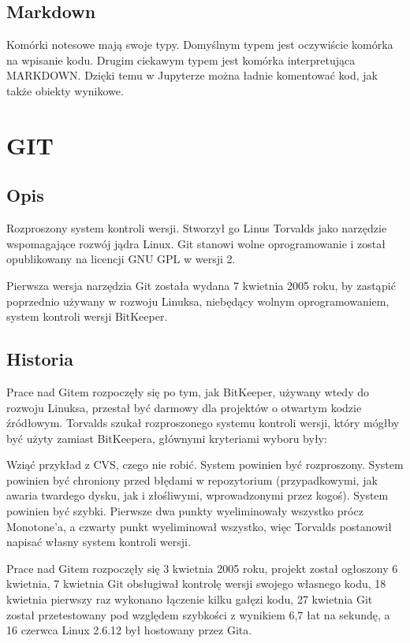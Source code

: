 \documentclass{article}
\begin{document}
\subsection{Markdown}
Komórki notesowe mają swoje typy. Domyślnym typem jest oczywiście komórka na wpisanie kodu. Drugim ciekawym typem jest komórka interpretująca MARKDOWN. Dzięki temu w Jupyterze można ładnie komentować kod, jak także obiekty wynikowe.
\newpage
\section{GIT}
\subsection{Opis}
Rozproszony system kontroli wersji. Stworzył go Linus Torvalds jako narzędzie wspomagające rozwój jądra Linux. Git stanowi wolne oprogramowanie i został opublikowany na licencji GNU GPL w wersji 2.

Pierwsza wersja narzędzia Git została wydana 7 kwietnia 2005 roku, by zastąpić poprzednio używany w rozwoju Linuksa, niebędący wolnym oprogramowaniem, system kontroli wersji BitKeeper.
\subsection{Historia}
Prace nad Gitem rozpoczęły się po tym, jak BitKeeper, używany wtedy do rozwoju Linuksa, przestał być darmowy dla projektów o otwartym kodzie źródłowym. Torvalds szukał rozproszonego systemu kontroli wersji, który mógłby być użyty zamiast BitKeepera, głównymi kryteriami wyboru były:

Wziąć przykład z CVS, czego nie robić.
System powinien być rozproszony.
System powinien być chroniony przed błędami w repozytorium (przypadkowymi, jak awaria twardego dysku, jak i złośliwymi, wprowadzonymi przez kogoś).
System powinien być szybki.
Pierwsze dwa punkty wyeliminowały wszystko prócz Monotone'a, a czwarty punkt wyeliminował wszystko, więc Torvalds postanowił napisać własny system kontroli wersji.

Prace nad Gitem rozpoczęły się 3 kwietnia 2005 roku, projekt został ogłoszony 6 kwietnia, 7 kwietnia Git obsługiwał kontrolę wersji swojego własnego kodu, 18 kwietnia pierwszy raz wykonano łączenie kilku gałęzi kodu, 27 kwietnia Git został przetestowany pod względem szybkości z wynikiem 6,7 łat na sekundę, a 16 czerwca Linux 2.6.12 był hostowany przez Gita.
\end{document}
